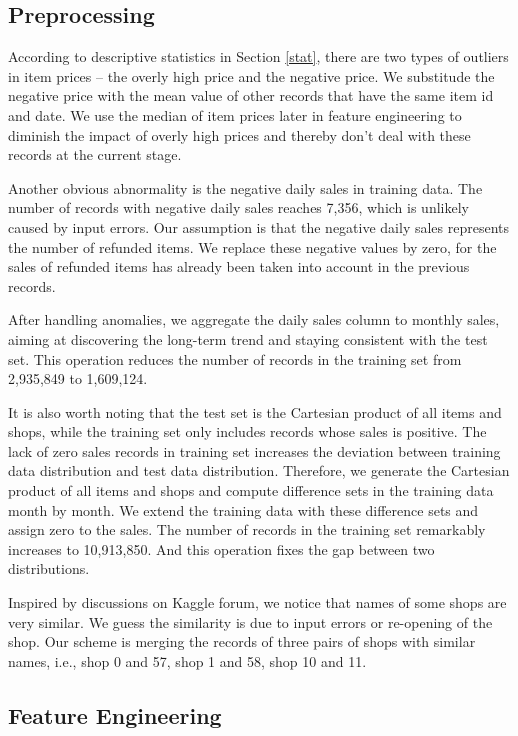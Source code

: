\documentclass{article}
\begin{document}
\subsection{Preprocessing}
According to descriptive statistics in Section \ref{stat}, there are two types of outliers in item prices -- the overly high price and the negative price. We substitude the negative price with the mean value of other records that have the same item id and date. We use the median of item prices later in feature engineering to diminish the impact of overly high prices and thereby don't deal with these records at the current stage.\par
Another obvious abnormality is the negative daily sales in training data. The number of records with negative daily sales reaches 7,356, which is unlikely caused by input errors. Our assumption is that the negative daily sales represents the number of refunded items. We replace these negative values by zero, for the sales of refunded items has already been taken into account in the previous records.\par
After handling anomalies, we aggregate the daily sales column to monthly sales, aiming at discovering the long-term trend and staying consistent with the test set. This operation reduces the number of records in the training set from 2,935,849 to 1,609,124.\par
It is also worth noting that the test set is the Cartesian product of all items and shops, while the training set only includes records whose sales is positive. The lack of zero sales records in training set increases the deviation between training data distribution and test data distribution. Therefore, we generate the Cartesian product of all items and shops and compute difference sets in the training data month by month. We extend the training data with these difference sets and assign zero to the sales. The number of records in the training set remarkably increases to 10,913,850. And this operation fixes the gap between two distributions. \par
Inspired by discussions on Kaggle forum, we notice that names of some shops are very similar. We guess the similarity is due to input errors or re-opening of the shop. Our scheme is merging the records of three pairs of shops with similar names, i.e., shop 0 and 57, shop 1 and 58, shop 10 and 11.

\subsection{Feature Engineering}
\end{document}
